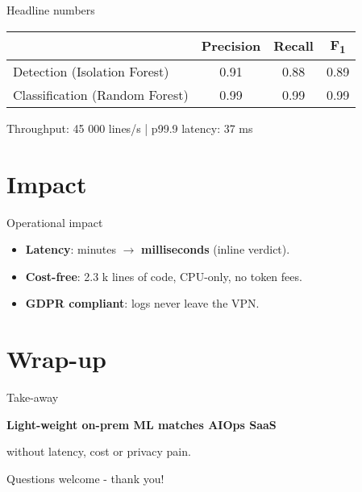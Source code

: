 \documentclass[15pt,aspectratio=169]{beamer}
\newcommand{\IForest}{Isolation Forest\xspace}
\newcommand{\RForest}{Random Forest\xspace}
\newcommand{\LOC}{lines of code\xspace}
\begin{document}

\begin{frame}{Headline numbers}
\centering
\begin{tabular}{lccc}
  \toprule
   & Precision & Recall & F\textsubscript{1} \\
  \midrule
  Detection (\IForest) & 0.91 & 0.88 & 0.89 \\
  Classification (\RForest) & 0.99 & 0.99 & 0.99 \\
  \bottomrule
\end{tabular}

\vspace{.8em}
\small
Throughput: 45 000 lines/s \;|\; p99.9 latency: 37 ms
\end{frame}

\section{Impact}

\begin{frame}{Operational impact}
\begin{itemize}[<+->]
  \item \textbf{Latency}: minutes $\rightarrow$ \textbf{milliseconds} (inline verdict).
  \item \textbf{Cost-free}: 2.3 k \LOC{}, CPU-only, no token fees.
  \item \textbf{GDPR compliant}: logs never leave the VPN.
\end{itemize}
\end{frame}

\section{Wrap-up}

\begin{frame}{Take-away}
\vspace{2em}
\centering
{\Large
  \textbf{Light-weight on-prem ML matches AIOps SaaS}\par
  \vspace{.4em}
  without latency, cost or privacy pain.
}

\vspace{2.2em}
\small
Questions welcome - thank you!
\end{frame}
\end{document}
